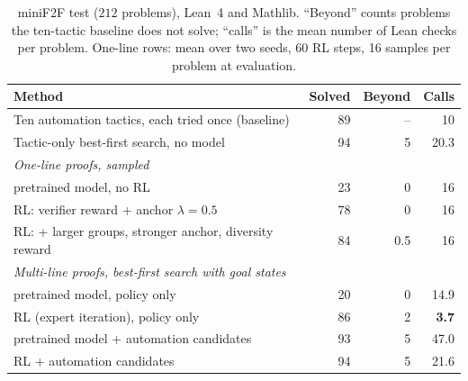 \documentclass[11pt]{article}
\theoremstyle{definition}
\begin{document}
\begin{table}[t]
\centering
\caption{miniF2F test ($212$ problems), Lean~4 and Mathlib. ``Beyond'' counts problems the ten-tactic baseline does not solve; ``calls'' is the mean number of Lean checks per problem. One-line rows: mean over two seeds, 60 RL steps, 16 samples per problem at evaluation.}\label{tab:minif2f}
\small
\begin{tabular}{lrrr}
\toprule
Method & Solved & Beyond & Calls \\
\midrule
Ten automation tactics, each tried once (baseline) & 89 & -- & 10 \\
Tactic-only best-first search, no model & 94 & 5 & 20.3 \\
\midrule
\multicolumn{4}{l}{\emph{One-line proofs, sampled}} \\
\quad pretrained model, no RL & 23 & 0 & 16 \\
\quad RL: verifier reward + anchor $\lambda=0.5$ & 78 & 0 & 16 \\
\quad RL: + larger groups, stronger anchor, diversity reward & 84 & 0.5 & 16 \\
\midrule
\multicolumn{4}{l}{\emph{Multi-line proofs, best-first search with goal states}} \\
\quad pretrained model, policy only & 20 & 0 & 14.9 \\
\quad RL (expert iteration), policy only & 86 & 2 & \textbf{3.7} \\
\quad pretrained model + automation candidates & 93 & 5 & 47.0 \\
\quad RL + automation candidates & 94 & 5 & 21.6 \\
\bottomrule
\end{tabular}
\end{table}
\end{document}
